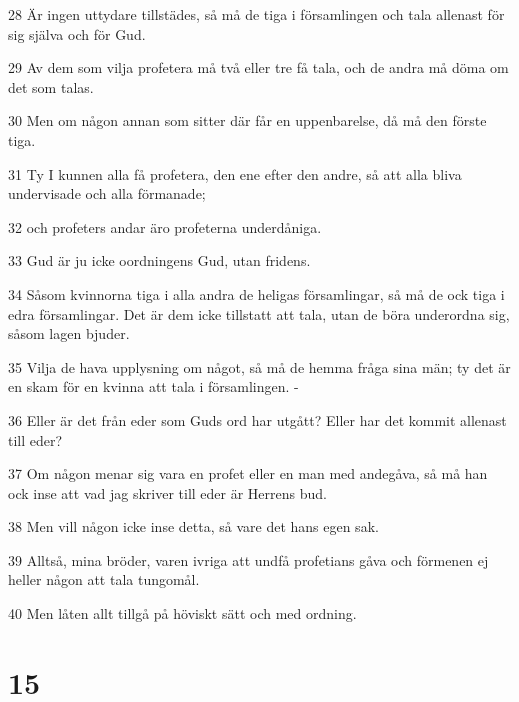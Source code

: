 \par 28 Är ingen uttydare tillstädes, så må de tiga i församlingen och tala allenast för sig själva och för Gud.
\par 29 Av dem som vilja profetera må två eller tre få tala, och de andra må döma om det som talas.
\par 30 Men om någon annan som sitter där får en uppenbarelse, då må den förste tiga.
\par 31 Ty I kunnen alla få profetera, den ene efter den andre, så att alla bliva undervisade och alla förmanade;
\par 32 och profeters andar äro profeterna underdåniga.
\par 33 Gud är ju icke oordningens Gud, utan fridens.
\par 34 Såsom kvinnorna tiga i alla andra de heligas församlingar, så må de ock tiga i edra församlingar. Det är dem icke tillstatt att tala, utan de böra underordna sig, såsom lagen bjuder.
\par 35 Vilja de hava upplysning om något, så må de hemma fråga sina män; ty det är en skam för en kvinna att tala i församlingen. -
\par 36 Eller är det från eder som Guds ord har utgått? Eller har det kommit allenast till eder?
\par 37 Om någon menar sig vara en profet eller en man med andegåva, så må han ock inse att vad jag skriver till eder är Herrens bud.
\par 38 Men vill någon icke inse detta, så vare det hans egen sak.
\par 39 Alltså, mina bröder, varen ivriga att undfå profetians gåva och förmenen ej heller någon att tala tungomål.
\par 40 Men låten allt tillgå på höviskt sätt och med ordning.

\chapter{15}

